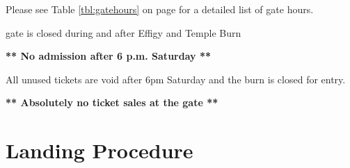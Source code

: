 Please see Table \ref{tbl:gatehours} on page \pageref{tbl:gatehours} for a detailed list of gate hours.

\Gls{gate} is closed during and after Effigy and Temple Burn

\textbf{** No admission after 6 p.m. Saturday **}
 
All unused tickets are void after 6pm Saturday and the burn is closed for entry. 

\textbf{** Absolutely no ticket sales at the gate **}

\clearpage

\section*{Landing Procedure}
\label{sec:parking}


